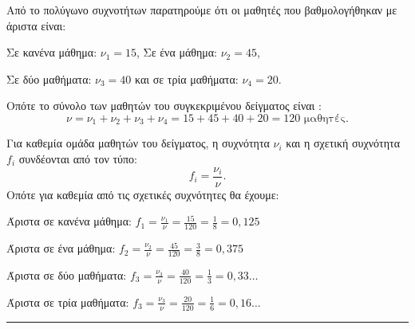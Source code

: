 \begin{alist}
    \item Από το πολύγωνο συχνοτήτων παρατηρούμε ότι οι μαθητές που βαθμολογήθηκαν με άριστα είναι:

    Σε κανένα μάθημα: $\nu_1=15$, Σε ένα μάθημα: $\nu_2=45$,

    Σε δύο μαθήματα: $\nu_3=40$ και σε τρία μαθήματα: $\nu_4=20$.

    Οπότε το σύνολο των μαθητών του συγκεκριμένου δείγματος είναι :
    \[ \nu=\nu_1+\nu_2+\nu_3+\nu_4=15+45+40+20=120 \text{ μαθητές}. \]
    
    \item Για καθεμία ομάδα μαθητών του δείγματος, η συχνότητα $\nu_i$ και η σχετική συχνότητα $f_i$ συνδέονται από τον τύπο:
    \[ f_i = \frac{\nu_i}{\nu}. \]
    Οπότε για καθεμία από τις σχετικές συχνότητες θα έχουμε:

    Άριστα σε κανένα μάθημα: $f_1 = \frac{\nu_1}{\nu} = \frac{15}{120} = \frac{1}{8} = 0,125$

    Άριστα σε ένα μάθημα: $f_2 = \frac{\nu_2}{\nu} = \frac{45}{120} = \frac{3}{8} = 0,375$

    Άριστα σε δύο μαθήματα: $f_3 = \frac{\nu_3}{\nu} = \frac{40}{120} = \frac{1}{3} = 0,33\dots$

    Άριστα σε τρία μαθήματα: $f_3 = \frac{\nu_3}{\nu} = \frac{20}{120} = \frac{1}{6} = 0,16\dots$
\end{alist}
\vspace{6mm}
\noindent\rule{\textwidth}{0.4pt}
\vspace{6mm}

